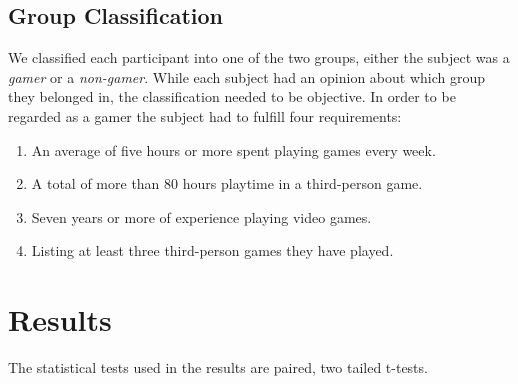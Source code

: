 \documentclass[runningheads,a4paper,oribibl]{llncs}
\begin{document}
\subsection{Group Classification} \label{subsec:GroupClassification}
We classified each participant into one of the two groups, either the subject was a \emph{gamer} or a \emph{non-gamer}. While each subject had an opinion about which group they belonged in, the classification needed to be objective. In order to be regarded as a gamer the subject had to fulfill four requirements:
\begin{enumerate}
   \item An average of five hours or more spent playing games every week. 
   \item A total of more than 80 hours playtime in a third-person game.
   \item Seven years or more of experience playing video games.
   \item Listing at least three third-person games they have played.
\end{enumerate}


%

























\section{Results}
The statistical tests used in the results are paired, two tailed t-tests.
\end{document}
